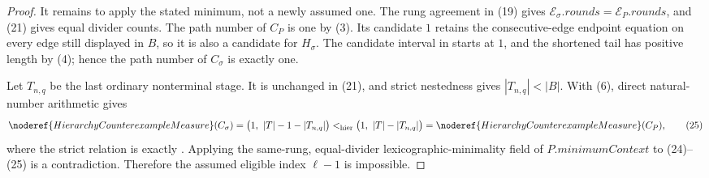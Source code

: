 \begin{proof}
It remains to apply the stated minimum, not a newly assumed one.  The rung
agreement in (19) gives
\(\mathcal E_\sigma.\mathit{rounds}=\mathcal E_P.\mathit{rounds}\),
and (21) gives equal divider counts.  The path number of \(C_P\) is one by
(3).  Its candidate \(1\) retains the consecutive-edge endpoint equation
on every edge still displayed in \(B\), so it is also a candidate for
\(H_\sigma\).  The candidate interval in
 starts at \(1\), and the shortened tail has
positive length by (4); hence the path number of \(C_\sigma\) is exactly
one.

Let \(T_{n,q}\) be the last ordinary nonterminal stage.  It is unchanged in
(21), and strict nestedness gives \(|T_{n,q}|<|B|\).  With (6), direct
natural-number arithmetic gives
\[
 \noderef{HierarchyCounterexampleMeasure}(C_\sigma)
   =\bigl(1,\ |T|-1-|T_{n,q}|\bigr)
   <_{\rm hier}
    \bigl(1,\ |T|-|T_{n,q}|\bigr)
   =\noderef{HierarchyCounterexampleMeasure}(C_P),             \tag{25}
\]
where the strict relation is exactly
.  Applying the
same-rung, equal-divider lexicographic-minimality field of
\(P.\mathit{minimumContext}\) to (24)--(25) is a contradiction.  Therefore
the assumed eligible index \(\ell-1\) is impossible.
\end{proof}
